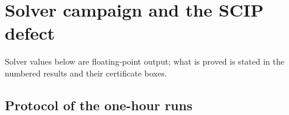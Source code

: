 \section{Solver campaign and the SCIP defect}\label{app:solvers}

Solver values below are floating-point output; what is proved is stated in the numbered results and their certificate boxes.

\subsection{Protocol of the one-hour runs}\label{app:solvers-protocol}

